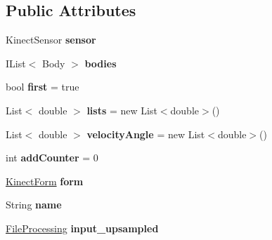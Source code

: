 \subsection*{Public Attributes}
\begin{DoxyCompactItemize}
\item 
Kinect\+Sensor {\bfseries sensor}\hypertarget{classkinect_expirement_1_1_kinect_sensor_class_adc9d831584e42495c1ade995e2b7296b}{}\label{classkinect_expirement_1_1_kinect_sensor_class_adc9d831584e42495c1ade995e2b7296b}

\item 
I\+List$<$ Body $>$ {\bfseries bodies}\hypertarget{classkinect_expirement_1_1_kinect_sensor_class_afa0208c2f32b2863875380181f23a968}{}\label{classkinect_expirement_1_1_kinect_sensor_class_afa0208c2f32b2863875380181f23a968}

\item 
bool {\bfseries first} = true\hypertarget{classkinect_expirement_1_1_kinect_sensor_class_a0849964fe5f5f578aa0acd1309f9c485}{}\label{classkinect_expirement_1_1_kinect_sensor_class_a0849964fe5f5f578aa0acd1309f9c485}

\item 
List$<$ double $>$ {\bfseries lists} = new List$<$double$>$()\hypertarget{classkinect_expirement_1_1_kinect_sensor_class_a7ae7082005aeaaf8ac981d39fecfa466}{}\label{classkinect_expirement_1_1_kinect_sensor_class_a7ae7082005aeaaf8ac981d39fecfa466}

\item 
List$<$ double $>$ {\bfseries velocity\+Angle} = new List$<$double$>$()\hypertarget{classkinect_expirement_1_1_kinect_sensor_class_a42a0ce3cb624cf8224a8c86353e2b453}{}\label{classkinect_expirement_1_1_kinect_sensor_class_a42a0ce3cb624cf8224a8c86353e2b453}

\item 
int {\bfseries add\+Counter} = 0\hypertarget{classkinect_expirement_1_1_kinect_sensor_class_a83d086426821c4d842d3f82465b57ae0}{}\label{classkinect_expirement_1_1_kinect_sensor_class_a83d086426821c4d842d3f82465b57ae0}

\item 
\hyperlink{classkinect_expirement_1_1_kinect_form}{Kinect\+Form} {\bfseries form}\hypertarget{classkinect_expirement_1_1_kinect_sensor_class_a0fc223d227f5f3f11b851738fae84be2}{}\label{classkinect_expirement_1_1_kinect_sensor_class_a0fc223d227f5f3f11b851738fae84be2}

\item 
String {\bfseries name}\hypertarget{classkinect_expirement_1_1_kinect_sensor_class_a920f2c46b543d2b82c9698baf8b3c91f}{}\label{classkinect_expirement_1_1_kinect_sensor_class_a920f2c46b543d2b82c9698baf8b3c91f}

\item 
\hyperlink{classkinect_expirement_1_1_file_processing}{File\+Processing} {\bfseries input\+\_\+upsampled}\hypertarget{classkinect_expirement_1_1_kinect_sensor_class_adac96427815a76b5703cda20158adb34}{}\label{classkinect_expirement_1_1_kinect_sensor_class_adac96427815a76b5703cda20158adb34}

\end{DoxyCompactItemize}


